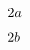 $
\mathchoice
    {\displaystyle{1a}}%
    {\textstyle{2a}}%
    {\scriptstyle{3a}}%
    {\scriptscriptstyle{4a}}
$   

$
\mathchoice
    {{\displaystyle{1b}}}%
    {{\textstyle{2b}}}%
    {{\scriptstyle{3b}}}%
    {{\scriptscriptstyle{4b}}}
$

\bye
